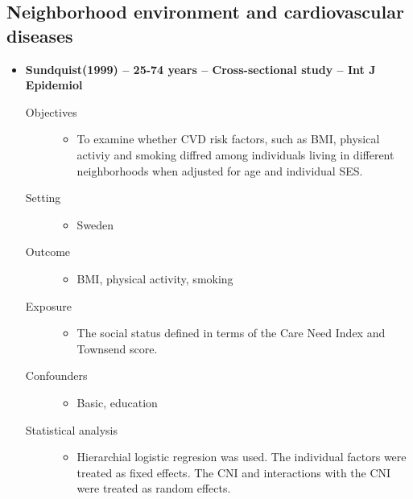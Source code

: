 \documentclass{article}
\begin{document}
\subsection{Neighborhood environment and cardiovascular diseases}
\begin{itemize}
	\item{\bf Sundquist(1999) -- 25-74 years -- Cross-sectional study -- Int J Epidemiol} 
		\begin{description}
			\item[Objectives]\mbox{}\par
				\begin{itemize}
					\item To examine whether CVD risk factors, such as BMI, physical activiy and smoking diffred among individuals living in different neighborhoods when adjusted for age and individual SES.
				\end{itemize}
			\item[Setting] \mbox{}\par
				\begin{itemize}
					\item  Sweden 
				\end{itemize}
			\item[Outcome]\mbox{}\par
				\begin{itemize}
					\item BMI, physical activity, smoking
				\end{itemize}
			\item[Exposure] \mbox{}\par
				\begin{itemize}
					\item The social status defined in terms of the Care Need Index and Townsend score.
				\end{itemize}
			\item[Confounders]\mbox{}\par 
				\begin{itemize}
					\item Basic, education
				\end{itemize}
			\item[Statistical analysis] \mbox{}\par
				\begin{itemize}
					\item Hierarchial logistic regresion was used. The individual factors were treated as fixed effects. The CNI and interactions with the CNI were treated as random effects.
				\end{itemize}

\end{description}
\end{itemize}
\end{document}
